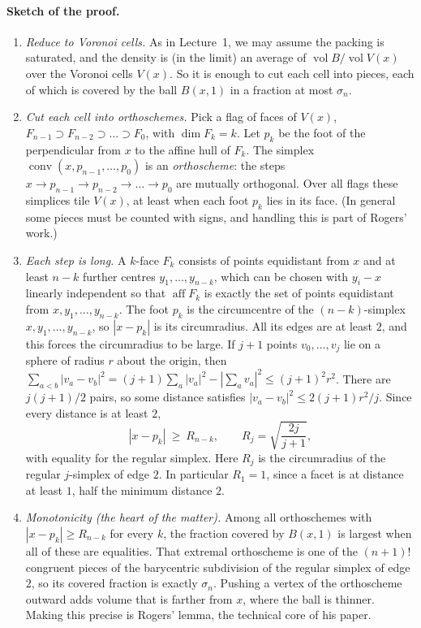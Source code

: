 \documentclass[11pt,openany]{book}
\theoremstyle{plain}
\theoremstyle{definition}
\theoremstyle{remark}
\newcommand{\vol}{\operatorname{vol}}
\newcommand{\conv}{\operatorname{conv}}
\newcommand{\abs}[1]{\left\lvert #1 \right\rvert}
\newcommand{\Ball}{B}                  %
\begin{document}
\paragraph{Sketch of the proof.}
\begin{enumerate}[label=(\arabic*)]
\item \emph{Reduce to Voronoi cells.} As in Lecture~1, we may assume the packing is saturated, and the
  density is (in the limit) an average of $\vol\Ball/\vol V(x)$ over the Voronoi cells $V(x)$. So it
  is enough to cut each cell into pieces, each of which is covered by the ball $\Ball(x,1)$ in a
  fraction at most $\sigma_n$.
\item \emph{Cut each cell into orthoschemes.} Pick a flag of faces of $V(x)$,
  $F_{n-1}\supset F_{n-2}\supset\dots\supset F_0$, with $\dim F_k=k$. Let $p_k$ be the foot of the
  perpendicular from $x$ to the affine hull of $F_k$. The simplex $\conv(x,p_{n-1},\dots,p_0)$ is an
  \emph{orthoscheme}: the steps $x\to p_{n-1}\to p_{n-2}\to\dots\to p_0$ are mutually orthogonal. Over all
  flags these simplices tile $V(x)$, at least when each foot $p_k$ lies in its face. (In general some
  pieces must be counted with signs, and handling this is part of Rogers' work.)
\item \emph{Each step is long.} A $k$-face $F_k$ consists of points equidistant from $x$ and at least
  $n-k$ further centres $y_1,\dots,y_{n-k}$, which can be chosen with $y_i-x$ linearly independent so
  that $\operatorname{aff}F_k$ is exactly the set of points equidistant from $x,y_1,\dots,y_{n-k}$. The foot $p_k$ is the circumcentre of the
  $(n-k)$-simplex $x,y_1,\dots,y_{n-k}$, so $\abs{x-p_k}$ is its circumradius. All its edges are at
  least $2$, and this forces the circumradius to be large. If $j+1$ points $v_0,\dots,v_j$ lie on a
  sphere of radius $r$ about the origin, then
  $\sum_{a<b}\abs{v_a-v_b}^2=(j+1)\sum_a\abs{v_a}^2-\abs{\sum_av_a}^2\le(j+1)^2r^2$. There are $j(j+1)/2$
  pairs, so some distance satisfies $\abs{v_a-v_b}^2\le 2(j+1)r^2/j$. Since every distance is at least $2$,
  \[
    \abs{x-p_k}\ \ge\ R_{n-k},\qquad R_j=\sqrt{\frac{2j}{j+1}},
  \]
  with equality for the regular simplex. Here $R_j$ is the circumradius of the regular $j$-simplex of edge $2$. In particular $R_1=1$, since a facet is at
  distance at least $1$, half the minimum distance $2$.
\item \emph{Monotonicity (the heart of the matter).} Among all orthoschemes with
  $\abs{x-p_k}\ge R_{n-k}$ for every $k$, the fraction covered by $\Ball(x,1)$ is largest when all of these
  are equalities. That extremal orthoscheme is one of the $(n+1)!$ congruent pieces of the barycentric
  subdivision of the regular simplex of edge $2$, so its covered fraction is exactly $\sigma_n$.
  Pushing a vertex of the orthoscheme outward adds volume that is farther from $x$, where the ball is
  thinner. Making this precise is Rogers' lemma, the technical core of his paper.
\end{enumerate}
\end{document}
